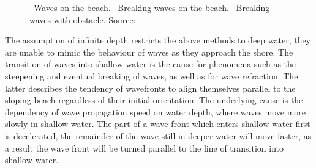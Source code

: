 \begin{figure}[t]
{	\label{fig:peachey1986:2}
 }
 \hfill
 \caption{~Waves on the beach.
~Breaking waves on the beach.
~Breaking waves with obstacle.
Source:~\cite{Peachey:1986}}
\label{fig:peachey1986}
\end{figure}
%

The assumption of infinite depth restricts the above methods to deep water,
they are unable to mimic the behaviour of waves as they approach the shore.
The transition of waves into shallow water is the cause for phenomena such
as the steepening and eventual breaking of waves, as well as for wave
refraction. The latter describes the tendency of wavefronts to align themselves
parallel to the sloping beach regardless of their initial orientation.
The underlying cause is the dependency of wave propagation speed on water depth,
where waves move more slowly in shallow water. The part of a wave front which
enters shallow water first is decelerated, the remainder of the wave still
in deeper water will move faster, as a result the wave front will be turned
parallel to the line of transition into shallow water.

